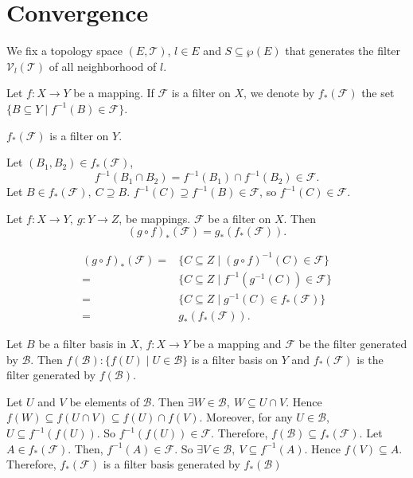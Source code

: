 \section{Convergence}
We fix a topology space $(E,\mathscr{T})$, $l\in E$ and $S\subseteq \wp(E)$ that generates the filter $\mathcal{V}_l(\mathscr{T})$ of all neighborhood  of $l$.
\begin{definitionenv}
    Let $f:X\longrightarrow Y$ be a mapping. If $\mathcal{F}$ is a filter on $X$, we denote by $f_*(\mathcal{F})$ the set $\{B\subseteq Y\mid f^{-1}(B)\in\mathcal{F}\}$. 
\end{definitionenv}
\begin{propositionenv}
    $f_*(\mathcal{F})$ is a filter on $Y$.
\end{propositionenv}
\begin{proofenv}
    Let $(B_1,B_2)\in f_*(\mathcal{F})$,
    $$f^{-1}(B_1\cap B_2)=f^{-1}(B_1)\cap f^{-1}(B_2)\in \mathcal{F}.$$
    Let $B\in f_*(\mathcal{F}),\ C\supseteq B$. $f^{-1}(C)\supseteq f^{-1}(B)\in\mathcal{F}$, so $f^{-1}(C)\in \mathcal{F}$.
\end{proofenv}
\begin{propositionenv}
    Let $f:X\longrightarrow Y, \ g:Y\longrightarrow Z$, be mappings. $\mathcal{F}$ be a filter on $X$. Then
    $$\left(g\circ f\right)_{*}(\mathcal{F})=g_*(f_*(\mathcal{F})).$$
\end{propositionenv}
\begin{proofenv}
    \begin{align*}
        \left(g\circ f\right)_*(\mathcal{F})=&\{C\subseteq Z\mid \left(g\circ f\right)^{-1}(C)\in\mathcal{F}\}\\
        =&\{C\subseteq Z\mid f^{-1}(g^{-1}(C))\in \mathcal{F}\}\\
        =&\{C\subseteq Z\mid g^{-1}(C)\in f_*(\mathcal{F})\}\\
        =&g_*(f_*(\mathcal{F})).
    \end{align*}
\end{proofenv}
\begin{propositionenv}
    Let $B$ be a filter basis in $X$,  $f:X\longrightarrow Y$ be a mapping and $\mathcal{F}$ be the filter generated by $\mathcal{B}$. Then $f(\mathcal{B}):\{f(U)\mid U\in \mathcal{B}\}$  is a filter basis on $Y$ and $f_*(\mathcal{F})$ is the filter generated by $f(\mathcal{B})$.
\end{propositionenv}
\begin{proofenv}
    Let $U$ and $V$ be elements of $\mathcal{B}$. Then $\exists W\in \mathcal{B},\ W\subseteq U\cap V$. Hence $f(W)\subseteq f(U\cap V)\subseteq f(U)\cap f(V).$ Moreover, for any $U\in\mathcal{B}$, $U\subseteq f^{-1}(f(U))$. So $f^{-1}(f(U))\in \mathcal{F}$. Therefore, $f(\mathcal{B})\subseteq f_*(\mathcal{F}) $. Let $A\in f_*(\mathcal{F})$. Then, $f^{-1}(A)\in \mathcal{F}$. So $\exists V\in \mathcal{B},\ V\subseteq f^{-1}(A)$. Hence $f(V)\subseteq A$. Therefore, $f_*(\mathcal{F})$ is a filter basis generated by $f_*(\mathcal{B})$
\end{proofenv}
